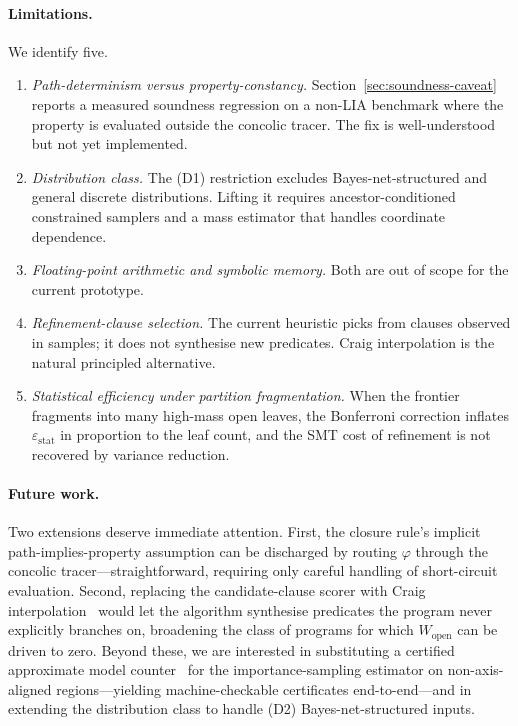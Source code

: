 \documentclass[runningheads]{llncs}
\providecommand{\Cref}[1]{Section~\ref{#1}}
\newcommand{\prop}{\varphi}
\newcommand{\Wopen}{W_{\mathrm{open}}}
\newcommand{\epsstat}{\varepsilon_{\mathrm{stat}}}
\begin{document}
\paragraph{Limitations.}
We identify five.

\begin{enumerate}
\item \emph{Path-determinism versus property-constancy.}
  \Cref{sec:soundness-caveat} reports a measured soundness regression
  on a non-LIA benchmark where the property is evaluated outside the
  concolic tracer.  The fix is well-understood but not yet
  implemented.

\item \emph{Distribution class.}  The (D1) restriction excludes
  Bayes-net-structured and general discrete distributions.  Lifting it
  requires ancestor-conditioned constrained samplers and a mass
  estimator that handles coordinate dependence.

\item \emph{Floating-point arithmetic and symbolic memory.}
  Both are out of scope for the current prototype.

\item \emph{Refinement-clause selection.}  The current heuristic
  picks from clauses observed in samples; it does not synthesise new
  predicates.  Craig interpolation is the natural principled
  alternative.

\item \emph{Statistical efficiency under partition fragmentation.}
  When the frontier fragments into many high-mass open leaves, the
  Bonferroni correction inflates $\epsstat$ in proportion to the leaf
  count, and the SMT cost of refinement is not recovered by variance
  reduction.
\end{enumerate}

\paragraph{Future work.}
Two extensions deserve immediate attention.  First, the closure rule's
implicit path-implies-property assumption can be discharged by routing
$\prop$ through the concolic tracer---straightforward, requiring only
careful handling of short-circuit evaluation.  Second, replacing the
candidate-clause scorer with Craig
interpolation~\cite{mcmillan2003interpolation,henzinger2004abstraction}
would let the algorithm synthesise predicates the program never
explicitly branches on, broadening the class of programs for which
$\Wopen$ can be driven to zero.  Beyond these, we are interested in
substituting a certified approximate model
counter~\cite{kiesl2024certified,yang2023approxmc6} for the
importance-sampling estimator on non-axis-aligned regions---yielding
machine-checkable certificates end-to-end---and in extending the
distribution class to handle (D2) Bayes-net-structured inputs.
\end{document}

